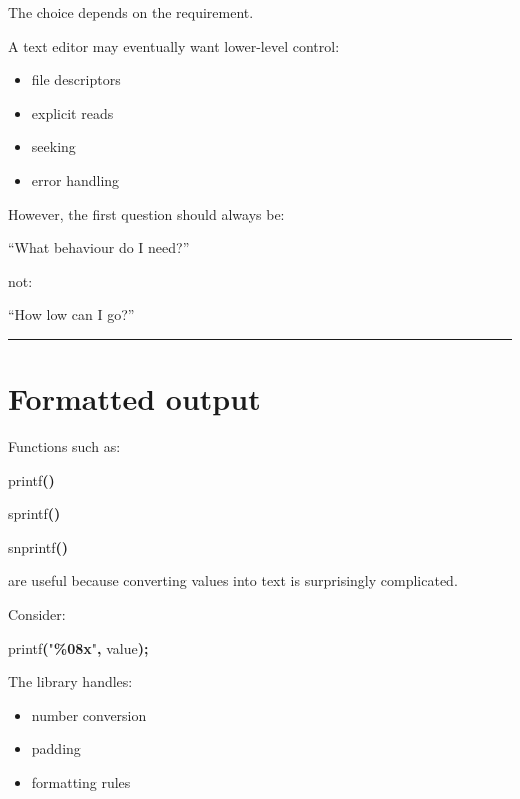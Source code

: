 \documentclass[
  oneside,
  openany]{book}
\newenvironment{Shaded}{\begin{snugshade}}{\end{snugshade}}
\newcommand{\NormalTok}[1]{#1}
\newcommand{\OperatorTok}[1]{\textcolor[rgb]{0.81,0.36,0.00}{\textbf{#1}}}
\newcommand{\SpecialCharTok}[1]{\textcolor[rgb]{0.81,0.36,0.00}{\textbf{#1}}}
\newcommand{\StringTok}[1]{\textcolor[rgb]{0.31,0.60,0.02}{#1}}
\providecommand{\tightlist}{%
  \setlength{\itemsep}{0pt}\setlength{\parskip}{0pt}}
\begin{document}
The choice depends on the requirement.

A text editor may eventually want lower-level control:

\begin{itemize}
\tightlist
\item
  file descriptors
\item
  explicit reads
\item
  seeking
\item
  error handling
\end{itemize}

However, the first question should always be:

``What behaviour do I need?''

not:

``How low can I go?''

\begin{center}\rule{0.5\linewidth}{0.5pt}\end{center}

\hypertarget{formatted-output}{%
\section{Formatted output}\label{formatted-output}}

Functions such as:

\begin{Shaded}
\begin{Highlighting}[]
\NormalTok{printf}\OperatorTok{()}

\NormalTok{sprintf}\OperatorTok{()}

\NormalTok{snprintf}\OperatorTok{()}
\end{Highlighting}
\end{Shaded}

are useful because converting values into text is surprisingly
complicated.

Consider:

\begin{Shaded}
\begin{Highlighting}[]
\NormalTok{printf}\OperatorTok{(}\StringTok{"}\SpecialCharTok{\%08x}\StringTok{"}\OperatorTok{,}\NormalTok{ value}\OperatorTok{);}
\end{Highlighting}
\end{Shaded}

The library handles:

\begin{itemize}
\tightlist
\item
  number conversion
\item
  padding
\item
  formatting rules
\end{itemize}
\end{document}
